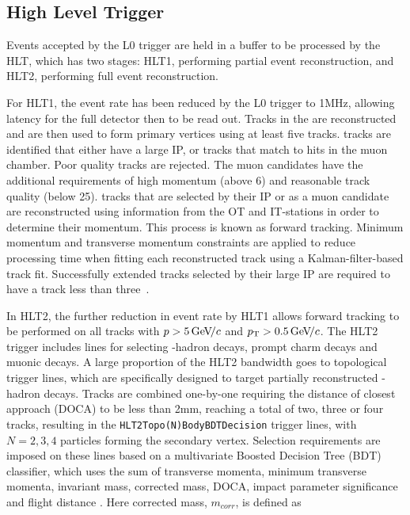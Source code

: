 \subsection{High Level Trigger}

Events accepted by the L0 trigger are held in a buffer to be processed by the HLT, which has two stages: HLT1, performing partial event reconstruction, and HLT2, performing full event reconstruction. 

For HLT1, the event rate has been reduced by the L0 trigger to 1MHz, allowing latency for the full detector then to be read out. Tracks in the \velo are reconstructed and are then used to form primary vertices using at least five tracks. \velo tracks are identified that either have a large IP, or tracks that match to hits in the muon chamber. Poor quality \velo tracks are rejected. The muon candidates have the additional requirements of high momentum (above 6\gevc) and reasonable track quality (\chisqndf below 25). \velo tracks that are selected by their IP or as a muon candidate are reconstructed using information from the OT and IT-stations in order to determine their momentum. This process is known as forward tracking. Minimum momentum and transverse momentum constraints are applied to reduce processing time when fitting each reconstructed track using a Kalman-filter-based track fit. Successfully extended \velo tracks selected by their large IP are required to have a track \chisq less than three~\cite{trigger_tim}.

In HLT2, the further reduction in event rate by HLT1 allows forward tracking to be performed on all \velo tracks with $p > 5{\mathrm{\,Ge\kern -0.1em V\!/}c}$ and $\mbox{$p_{\mathrm{ T}}$} > 0.5{\mathrm{\,Ge\kern -0.1em V\!/}c}$. The HLT2 trigger includes lines for selecting \bquark-hadron decays, prompt charm decays and muonic decays. A large proportion of the HLT2 bandwidth goes to topological trigger lines, which are specifically designed to target partially reconstructed \bquark-hadron decays. Tracks are combined one-by-one requiring the distance of closest approach (DOCA) to be less than 2mm, reaching a total of two, three or four tracks, resulting in the {\tt HLT2Topo(N)BodyBDTDecision} trigger lines, with $N = 2,3,4$ particles forming the secondary vertex. Selection requirements are imposed on these lines based on a multivariate Boosted Decision Tree (BDT) classifier, which uses the sum of transverse momenta, minimum transverse momenta, invariant mass, corrected mass, DOCA, impact parameter significance and flight distance \chisq. Here corrected mass, $m_{corr}$, is defined as

